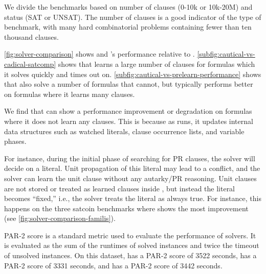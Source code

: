We divide the benchmarks based on number of clauses (0-10k or 10k-20M) and
status (SAT or UNSAT). The number of clauses is a good indicator of the type of
benchmark, with many hard combinatorial problems containing fewer than ten
thousand clauses.

\autoref{fig:solver-comparison} shows \tool and \cadical's performance relative
to \cadical.
\autoref{subfig:cautical-vs-cadical-satcomp} shows that \tool learns a large
number of \pr clauses for formulas which it solves quickly and \cadical times
out on. \autoref{subfig:cautical-vs-prelearn-performance} shows that \prelearn
also solve a number of formulas that \tool cannot, but \tool typically performs
better on formulas where it learns many \pr clauses.

We find that \tool can show a performance improvement or degradation on formulas
where it does not learn any \pr clauses. This is because as \tool runs, it
updates internal data structures such as watched literals, clause occurrence
lists, and variable phases. 

For instance, during the initial phase of searching for PR clauses, the solver
will decide on a literal. Unit propagation of this literal may lead to a
conflict, and the solver can learn the unit clause without any autarky/PR
reasoning. Unit clauses are not stored or treated as learned clauses inside
\cadical, but instead the literal becomes “fixed,” i.e., the solver treats the
literal as always true. For instance, this happens on the three satcoin
benchmarks where \tool shows the most improvement (see
\autoref{fig:solver-comparison-familis}).


PAR-2 score is a standard metric used to evaluate the performance of solvers. It
is evaluated as the sum of the runtimes of solved instances and twice the
timeout of unsolved instances. On this dataset, \cadical has a PAR-2 score of
3522 seconds, \prelearn has a PAR-2 score of 3331 seconds, and \tool has a PAR-2
score of 3442 seconds. 

